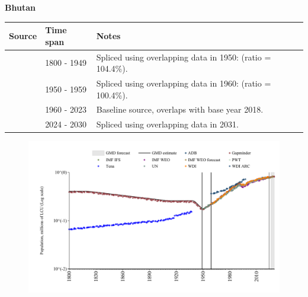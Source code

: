 \documentclass[12pt,a4paper,landscape]{article}
\begin{document}
\begin{adjustbox}{max totalsize={\paperwidth}{\paperheight},center}
\begin{minipage}[t][\textheight][t]{\textwidth}
\vspace*{0.5cm}
{}
\begin{center}
{\Large\bfseries Bhutan}
\end{center}
\vspace{0.5cm}
\begin{table}[H]
\centering
\small
\begin{tabular}{|l|l|l|}
\hline
\textbf{Source} & \textbf{Time span} & \textbf{Notes} \\
\hline
\rowcolor{white}\cite{Gapminder}& 1800 - 1949 &Spliced using overlapping data in 1950: (ratio = 104.4\%).\\
\rowcolor{lightgray}\cite{IMF_IFS}& 1950 - 1959 &Spliced using overlapping data in 1960: (ratio = 100.4\%).\\
\rowcolor{white}\cite{WDI}& 1960 - 2023 &Baseline source, overlaps with base year 2018.\\
\rowcolor{lightgray}\cite{Gapminder}& 2024 - 2030 &Spliced using overlapping data in 2031.\\
\hline
\end{tabular}
\end{table}
\begin{figure}[H]
\centering
\includegraphics[width=\textwidth,height=0.6\textheight,keepaspectratio]{graphs/BTN_pop.pdf}
\end{figure}
\end{minipage}
\end{adjustbox}
\end{document}
